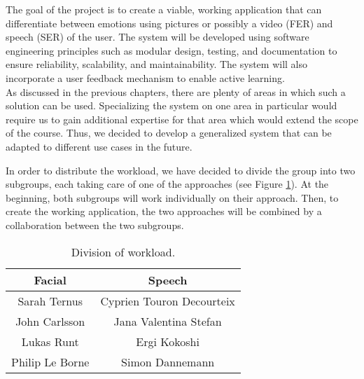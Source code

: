 \noindent 
The goal of the project is to create a viable, working application that can differentiate between emotions using pictures or possibly a video (FER) and speech (SER) of the user.
The system will be developed using software engineering principles such as modular design, testing, and documentation to ensure reliability, scalability, and maintainability. The system will also incorporate a user feedback mechanism to enable active learning. \\


\noindent 
As discussed in the previous chapters, there are plenty of areas in which such a solution can be used. 
Specializing the system on one area in particular would require us to gain additional expertise for that area which would extend the scope of the course. Thus, we decided to develop a generalized system that can be adapted to different use cases in the future. 

\noindent In order to distribute the workload, we have decided to divide the group into two subgroups, each taking care of one of the approaches (see Figure \ref{fig:workload_division}). At the beginning, both subgroups will work individually on their approach. Then, to create the working application, the two approaches will be combined by a collaboration between the two subgroups.  
\\



\begin{table}
\begin{center}
\begin{tabular}{ |c|c| } 
 \hline
 Facial & Speech \\
 \hline
 Sarah Ternus & Cyprien Touron Decourteix \\ 
 John Carlsson & Jana Valentina Stefan \\ 
 Lukas Runt & Ergi Kokoshi \\ 
 Philip Le Borne & Simon Dannemann \\
 \hline
\end{tabular}
\caption{Division of workload.}\label{fig:workload_division}
\end{center}
\end{table}



